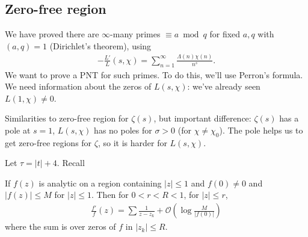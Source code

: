 \documentclass{article}
\newcommand{\1}{\mathbbm{1}}
\newcommand{\bigO}{\mathcal{O}}
\begin{document}
\subsection{Zero-free region}
\newlec
We have proved there are $\infty$-many primes $\equiv a \bmod{q}$ for fixed $a,q$ with $(a,q) = 1$ (Dirichlet's theorem), using
\begin{align*}
  -\frac{L'}{L}(s,\chi) = \sum_{n=1}^\infty \frac{\Lambda(n) \chi(n)}{n^s}.
\end{align*}
We want to prove a PNT for such primes. To do this, we'll use Perron's formula.
We need information about the zeros of $L(s,\chi)$: we've already seen $L(1,\chi) \neq 0$.

Similarities to zero-free region for $\zeta(s)$, but important difference: $\zeta(s)$ has a pole at $s=1$, $L(s,\chi)$ has no poles for $\sigma > 0$ (for $\chi \neq \chi_0$).
The pole helps us to get zero-free regions for $\zeta$, so it is harder for $L(s,\chi)$.

Let $\tau = |t| + 4$.
Recall
\begin{lemma}
  If $f(z)$ is analytic on a region containing $|z| \leq 1$ and $f(0) \neq 0$ and $|f(z)| \leq M$ for $|z| \leq 1$.
  Then for $0 < r < R < 1$, for $|z| \leq r$,
  \begin{align*}
    \frac{f'}{f}(z) = \sum \frac{1}{z-z_k} + \bigO\left(\log \frac{M}{|f(0)|}\right)
  \end{align*}
  where the sum is over zeros of $f$ in $|z_k| \leq R$.
\end{lemma}
\end{document}
